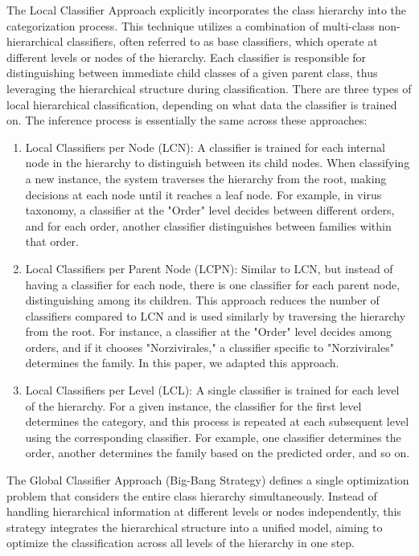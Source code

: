 The Local Classifier Approach explicitly incorporates the class hierarchy into the categorization process. This technique utilizes a combination of multi-class non-hierarchical classifiers, often referred to as base classifiers, which operate at different levels or nodes of the hierarchy. Each classifier is responsible for distinguishing between immediate child classes of a given parent class, thus leveraging the hierarchical structure during classification. There are three types of local hierarchical classification, depending on what data the classifier is trained on. The inference process is essentially the same across these approaches:
\begin{enumerate}
\item{Local Classifiers per Node (LCN)}: A classifier is trained for each internal node in the hierarchy to distinguish between its child nodes. When classifying a new instance, the system traverses the hierarchy from the root, making decisions at each node until it reaches a leaf node. For example, in virus taxonomy, a classifier at the "Order" level decides between different orders, and for each order, another classifier distinguishes between families within that order.
\item{Local Classifiers per Parent Node (LCPN)}: Similar to LCN, but instead of having a classifier for each node, there is one classifier for each parent node, distinguishing among its children. This approach reduces the number of classifiers compared to LCN and is used similarly by traversing the hierarchy from the root. For instance, a classifier at the "Order" level decides among orders, and if it chooses "Norzivirales," a classifier specific to "Norzivirales" determines the family. In this paper, we adapted this approach.
\item{Local Classifiers per Level (LCL)}: A single classifier is trained for each level of the hierarchy. For a given instance, the classifier for the first level determines the category, and this process is repeated at each subsequent level using the corresponding classifier. For example, one classifier determines the order, another determines the family based on the predicted order, and so on.
\end{enumerate}

The Global Classifier Approach (Big-Bang Strategy) defines a single optimization problem that considers the entire class hierarchy simultaneously. Instead of handling hierarchical information at different levels or nodes independently, this strategy integrates the hierarchical structure into a unified model, aiming to optimize the classification across all levels of the hierarchy in one step.

